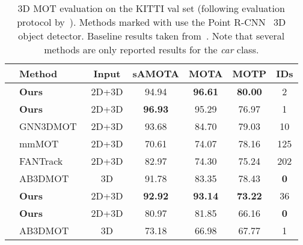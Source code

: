 \documentclass[letterpaper, 10 pt, conference]{ieeeconf}
\begin{document}
\begin{table}
\scriptsize
\begin{center}


\begin{tabular}{c|l|c|c|c|c|c}
\toprule
& Method & Input & sAMOTA & MOTA & MOTP & IDs\\
\hline\hline
\parbox[t]{1mm}{} 
& \textbf{Ours} & 2D+3D & 94.94 & \textbf{96.61} & \textbf{80.00}  & 2 \\
& \textbf{Ours} & 2D+3D &  \textbf{96.93} & 95.29 & 76.97 & {1} \\
& GNN3DMOT~\cite{weng20cvpr} & 2D+3D &   93.68 & 84.70 & 79.03 & 10 \\

& mmMOT~\cite{zhang2019robust}  & 2D+3D &  70.61 & 74.07 & 78.16 & 125 \\
& FANTrack~\cite{baser2019fantrack} & 2D+3D &  82.97 & 74.30 & 75.24 &  202 \\

& AB3DMOT~\cite{Weng2020_AB3DMOT} & 3D &  91.78 & 83.35 & 78.43 &  \textbf{0} \\

\hline\hline
\parbox[t]{1mm}{} 
& \textbf{Ours} & 2D+3D &  \textbf{92.92} & \textbf{93.14} & \textbf{73.22} &  36 \\
& \textbf{Ours} & 2D+3D &  80.97 & 81.85 &  66.16  & \textbf{0} \\
& AB3DMOT~\cite{Weng2020_AB3DMOT} & 3D &  73.18 & 66.98 & 67.77  & 1 \\
\bottomrule
\end{tabular}
\end{center}
\vspace{-7pt}
\caption{3D MOT evaluation on the KITTI val set (following evaluation protocol by~\cite{Weng2020_AB3DMOT}). Methods marked with  use the Point R-CNN~\cite{Shi19CVPR} 3D object detector. Baseline results taken from~\cite{weng20cvpr}. Note that several methods are only reported results for the \textit{car} class.}
\label{tab:mot3d}
\end{table}
% 
\end{document}
